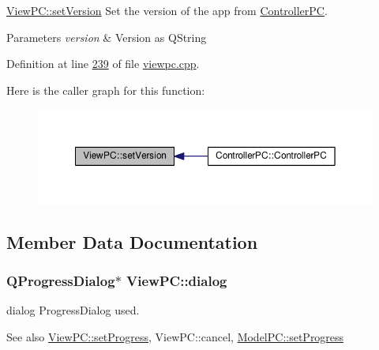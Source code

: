 \hyperlink{class_view_p_c_ac05220df875b7c4f24405a5742476ebf}{View\+P\+C\+::set\+Version} Set the version of the app from \hyperlink{class_controller_p_c}{Controller\+PC}. 


\begin{DoxyParams}{Parameters}
{\em version} & Version as Q\+String \\
\hline
\end{DoxyParams}


Definition at line \hyperlink{viewpc_8cpp_source_l00239}{239} of file \hyperlink{viewpc_8cpp_source}{viewpc.\+cpp}.



Here is the caller graph for this function\+:
\nopagebreak
\begin{figure}[H]
\begin{center}
\leavevmode
\includegraphics[width=350pt]{class_view_p_c_ac05220df875b7c4f24405a5742476ebf_icgraph}
\end{center}
\end{figure}




\subsection{Member Data Documentation}
\subsubsection[{\texorpdfstring{dialog}{dialog}}]{\setlength{\rightskip}{0pt plus 5cm}Q\+Progress\+Dialog$\ast$ View\+P\+C\+::dialog}\hypertarget{class_view_p_c_a31abbb470fe329b44e6ffee202b903ca}{}\label{class_view_p_c_a31abbb470fe329b44e6ffee202b903ca}


dialog Progress\+Dialog used. 

\begin{DoxySeeAlso}{See also}
\hyperlink{class_view_p_c_a9c32a1fdb6ead84e5ada8fba8860c7ed}{View\+P\+C\+::set\+Progress}, View\+P\+C\+::cancel, \hyperlink{class_model_p_c_afdcd80f0ed5062e145a71f09b0897547}{Model\+P\+C\+::set\+Progress} 
\end{DoxySeeAlso}


